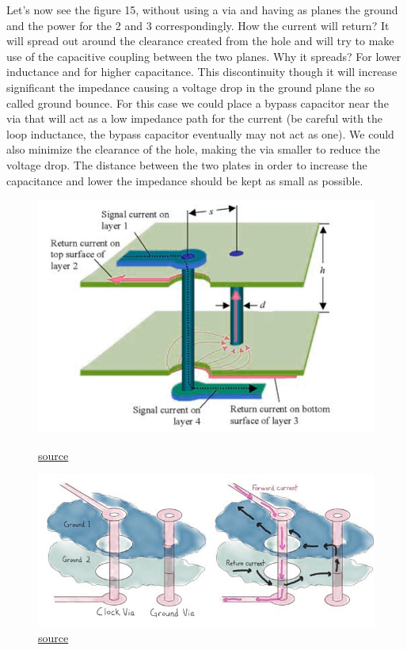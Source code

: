 \documentclass[final]{cubedoc}
\begin{document}
	Let's now see the figure 15, without using a via and having as planes the ground and the power for the 2 and 3 correspondingly. How the current will return? It will spread out around the clearance created from the hole and will try to make use of the capacitive coupling between the two planes. Why it spreads? For lower inductance and for higher capacitance. This discontinuity though it will increase significant the impedance causing a voltage drop in the ground plane the so called ground bounce. For this case we could place a bypass capacitor near the via that will act as a low impedance path for the current (be careful with the loop inductance, the bypass capacitor eventually may not act as one). We could also minimize the clearance of the hole, making the via smaller to reduce the voltage drop. The distance between the two plates in order to increase the capacitance and lower the impedance should be kept as small as possible.
	
	\begin{figure}[h!]
		\centering
		\begin{minipage}[b]{0.4\textwidth}
			\includegraphics[keepaspectratio, width=\textwidth]{assets/change_layer.png}
			\caption{\href{http://www.sigcon.com/Pubs/news/6_04.htm}{source}}
		\end{minipage}
		\hfill
		\begin{minipage}[b]{0.4\textwidth}
			\includegraphics[width=\textwidth, keepaspectratio]{assets/ground_trans.png}
			\caption{\href{https://www.tempoautomation.com/blog/design-to-avoid-emi-problems-keep-clocks-away-from-unintended-antennas/}{source}}
		\end{minipage}
	\end{figure}
	
\end{document}
